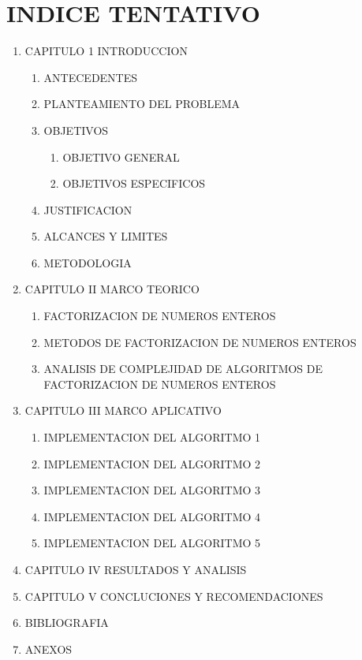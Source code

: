 \documentclass[12pt,letterpaper]{book}
\begin{document}
    \chapter{INDICE TENTATIVO}
    \begin{enumerate}
        \item{CAPITULO 1 INTRODUCCION}
        \begin{enumerate}
            \item{ANTECEDENTES}
            \item{PLANTEAMIENTO DEL PROBLEMA}
            \item{OBJETIVOS}
            \begin{enumerate}
                \item{OBJETIVO GENERAL}
                \item{OBJETIVOS ESPECIFICOS}
            \end{enumerate}
            \item{JUSTIFICACION}
            \item{ALCANCES Y LIMITES}
            \item{METODOLOGIA}
        \end{enumerate}
        \item{CAPITULO II MARCO TEORICO}
        \begin{enumerate}
            \item{FACTORIZACION DE NUMEROS ENTEROS}
            \item{METODOS DE FACTORIZACION DE NUMEROS ENTEROS}
            \item{ANALISIS DE COMPLEJIDAD DE ALGORITMOS DE FACTORIZACION DE NUMEROS ENTEROS}
        \end{enumerate}
        \item{CAPITULO III MARCO APLICATIVO}
        \begin{enumerate}
            \item{IMPLEMENTACION DEL ALGORITMO 1}
            \item{IMPLEMENTACION DEL ALGORITMO 2}
            \item{IMPLEMENTACION DEL ALGORITMO 3}
            \item{IMPLEMENTACION DEL ALGORITMO 4}
            \item{IMPLEMENTACION DEL ALGORITMO 5}
        \end{enumerate}
        \item{CAPITULO IV RESULTADOS Y ANALISIS}
        \item{CAPITULO V CONCLUCIONES Y RECOMENDACIONES}
        \item{BIBLIOGRAFIA}
        \item{ANEXOS}
    \end{enumerate}
\end{document}

